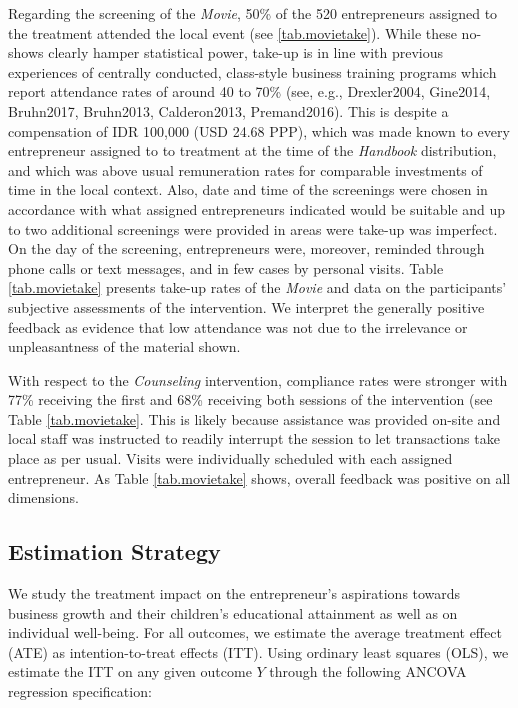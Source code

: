 \documentclass[11.5pt]{article}
\begin{document}
Regarding the screening of the \emph{Movie}, 50\% of the 520 entrepreneurs assigned to the treatment attended the local event (see \ref{tab.movietake}). While these no-shows clearly hamper statistical power, take-up is in line with previous experiences of centrally conducted, class-style business training programs which report attendance rates of around 40 to 70\% (see, e.g., Drexler2004, Gine2014, Bruhn2017, Bruhn2013, Calderon2013, Premand2016). This is despite a compensation of IDR 100,000 (USD 24.68 PPP), which was made known to every entrepreneur assigned to to treatment at the time of the \emph{Handbook} distribution, and which was above usual remuneration rates for comparable investments of time in the local context. Also, date and time of the screenings were chosen in accordance with what assigned entrepreneurs indicated would be suitable and up to two additional screenings were provided in areas were take-up was imperfect. On the day of the screening, entrepreneurs were, moreover, reminded through phone calls or text messages, and in few cases by personal visits. Table \ref{tab.movietake} presents take-up rates of the \emph{Movie} and data on the participants' subjective assessments of the intervention. We interpret the generally positive feedback as evidence that low attendance was not due to the irrelevance or unpleasantness of the material shown.

With respect to the \emph{Counseling} intervention, compliance rates were stronger with 77\% receiving the first and 68\% receiving both sessions of the intervention (see Table \ref{tab.movietake}. This is likely because assistance was provided on-site and local staff was instructed to readily interrupt the session to let transactions take place as per usual. Visits were individually scheduled with each assigned entrepreneur. As Table \ref{tab.movietake} shows, overall feedback was positive on all dimensions.

\subsection{Estimation Strategy}

We study the treatment impact on the entrepreneur's aspirations towards business growth and their children's educational attainment as well as on individual well-being. For all outcomes, we estimate the average treatment effect (ATE) as intention-to-treat effects (ITT). Using ordinary least squares (OLS), we estimate the ITT on any given outcome $Y$ through the following ANCOVA regression specification:
\end{document}
